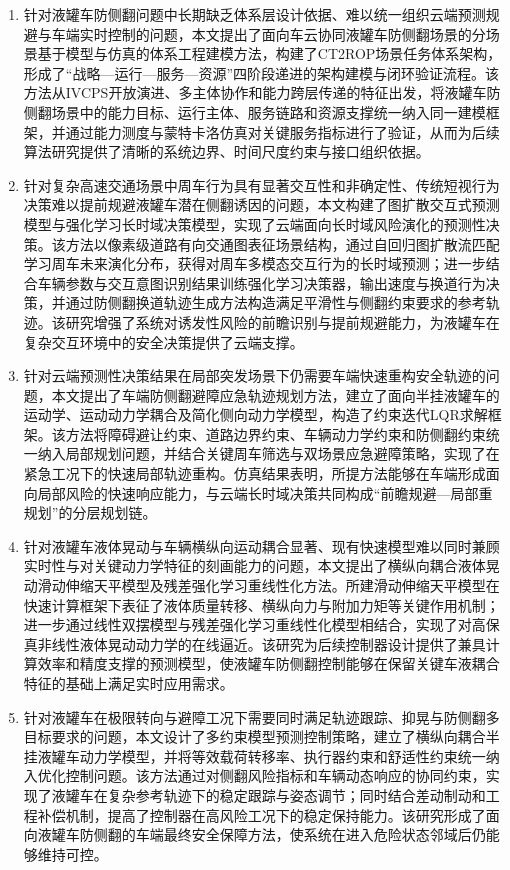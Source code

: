 \begin{enumerate}[itemsep=2pt, parsep=0pt]
    \item 针对液罐车防侧翻问题中长期缺乏体系层设计依据、难以统一组织云端预测规避与车端实时控制的问题，本文提出了面向车云协同液罐车防侧翻场景的分场景基于模型与仿真的体系工程建模方法，构建了CT2ROP场景任务体系架构，形成了“战略—运行—服务—资源”四阶段递进的架构建模与闭环验证流程。该方法从IVCPS开放演进、多主体协作和能力跨层传递的特征出发，将液罐车防侧翻场景中的能力目标、运行主体、服务链路和资源支撑统一纳入同一建模框架，并通过能力测度与蒙特卡洛仿真对关键服务指标进行了验证，从而为后续算法研究提供了清晰的系统边界、时间尺度约束与接口组织依据。
    
    \item 针对复杂高速交通场景中周车行为具有显著交互性和非确定性、传统短视行为决策难以提前规避液罐车潜在侧翻诱因的问题，本文构建了图扩散交互式预测模型与强化学习长时域决策模型，实现了云端面向长时域风险演化的预测性决策。该方法以像素级道路有向交通图表征场景结构，通过自回归图扩散流匹配学习周车未来演化分布，获得对周车多模态交互行为的长时域预测；进一步结合车辆参数与交互意图识别结果训练强化学习决策器，输出速度与换道行为决策，并通过防侧翻换道轨迹生成方法构造满足平滑性与侧翻约束要求的参考轨迹。该研究增强了系统对诱发性风险的前瞻识别与提前规避能力，为液罐车在复杂交互环境中的安全决策提供了云端支撑。
    
    \item 针对云端预测性决策结果在局部突发场景下仍需要车端快速重构安全轨迹的问题，本文提出了车端防侧翻避障应急轨迹规划方法，建立了面向半挂液罐车的运动学、运动动力学耦合及简化侧向动力学模型，构造了约束迭代LQR求解框架。该方法将障碍避让约束、道路边界约束、车辆动力学约束和防侧翻约束统一纳入局部规划问题，并结合关键周车筛选与双场景应急避障策略，实现了在紧急工况下的快速局部轨迹重构。仿真结果表明，所提方法能够在车端形成面向局部风险的快速响应能力，与云端长时域决策共同构成“前瞻规避—局部重规划”的分层规划链。
    
    \item 针对液罐车液体晃动与车辆横纵向运动耦合显著、现有快速模型难以同时兼顾实时性与对关键动力学特征的刻画能力的问题，本文提出了横纵向耦合液体晃动滑动伸缩天平模型及残差强化学习重线性化方法。所建滑动伸缩天平模型在快速计算框架下表征了液体质量转移、横纵向力与附加力矩等关键作用机制；进一步通过线性双摆模型与残差强化学习重线性化模型相结合，实现了对高保真非线性液体晃动动力学的在线逼近。该研究为后续控制器设计提供了兼具计算效率和精度支撑的预测模型，使液罐车防侧翻控制能够在保留关键车液耦合特征的基础上满足实时应用需求。
    
    \item 针对液罐车在极限转向与避障工况下需要同时满足轨迹跟踪、抑晃与防侧翻多目标要求的问题，本文设计了多约束模型预测控制策略，建立了横纵向耦合半挂液罐车动力学模型，并将等效载荷转移率、执行器约束和舒适性约束统一纳入优化控制问题。该方法通过对侧翻风险指标和车辆动态响应的协同约束，实现了液罐车在复杂参考轨迹下的稳定跟踪与姿态调节；同时结合差动制动和工程补偿机制，提高了控制器在高风险工况下的稳定保持能力。该研究形成了面向液罐车防侧翻的车端最终安全保障方法，使系统在进入危险状态邻域后仍能够维持可控。
    

\end{enumerate}
